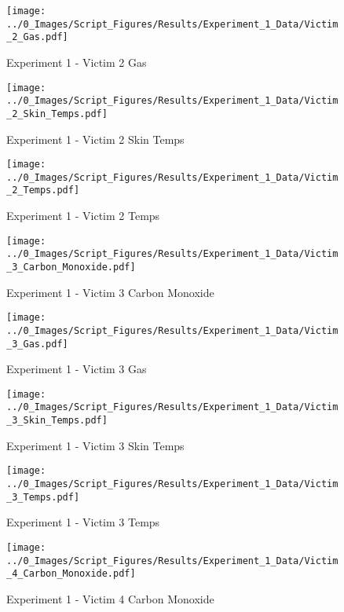 	\begin{figure}[H]
		\centering
		\texttt{[image: ../0\_Images/Script\_Figures/Results/Experiment\_1\_Data/Victim\_2\_Gas.pdf]}
		\caption[]{Experiment 1 - Victim 2 Gas}
	\end{figure}
 
	\clearpage

	\begin{figure}[H]
		\centering
		\texttt{[image: ../0\_Images/Script\_Figures/Results/Experiment\_1\_Data/Victim\_2\_Skin\_Temps.pdf]}
		\caption[]{Experiment 1 - Victim 2 Skin Temps}
	\end{figure}
 

	\begin{figure}[H]
		\centering
		\texttt{[image: ../0\_Images/Script\_Figures/Results/Experiment\_1\_Data/Victim\_2\_Temps.pdf]}
		\caption[]{Experiment 1 - Victim 2 Temps}
	\end{figure}
 
	\clearpage

	\begin{figure}[H]
		\centering
		\texttt{[image: ../0\_Images/Script\_Figures/Results/Experiment\_1\_Data/Victim\_3\_Carbon\_Monoxide.pdf]}
		\caption[]{Experiment 1 - Victim 3 Carbon Monoxide}
	\end{figure}
 

	\begin{figure}[H]
		\centering
		\texttt{[image: ../0\_Images/Script\_Figures/Results/Experiment\_1\_Data/Victim\_3\_Gas.pdf]}
		\caption[]{Experiment 1 - Victim 3 Gas}
	\end{figure}
 
	\clearpage

	\begin{figure}[H]
		\centering
		\texttt{[image: ../0\_Images/Script\_Figures/Results/Experiment\_1\_Data/Victim\_3\_Skin\_Temps.pdf]}
		\caption[]{Experiment 1 - Victim 3 Skin Temps}
	\end{figure}
 

	\begin{figure}[H]
		\centering
		\texttt{[image: ../0\_Images/Script\_Figures/Results/Experiment\_1\_Data/Victim\_3\_Temps.pdf]}
		\caption[]{Experiment 1 - Victim 3 Temps}
	\end{figure}
 
	\clearpage

	\begin{figure}[H]
		\centering
		\texttt{[image: ../0\_Images/Script\_Figures/Results/Experiment\_1\_Data/Victim\_4\_Carbon\_Monoxide.pdf]}
		\caption[]{Experiment 1 - Victim 4 Carbon Monoxide}
	\end{figure}
 

